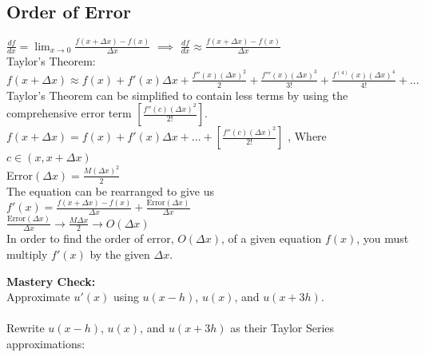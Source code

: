 \documentclass{article}
\def\ds{\displaystyle}
\def\d#1#2{\frac{d#1}{d#2}} %
\begin{document}
\subsection{Order of Error}
\begin{center}
$\ds \d{f}{x} = \lim_{x \to 0} \frac{f(x + \Delta x) - f(x)}{\Delta x}$ \hspace{1cm} $\implies$ \hspace{1cm}
$\ds \d{f}{x} \approx \frac{f(x + \Delta x) - f(x)}{\Delta x}$ \\ \vspace{5mm}
Taylor's Theorem: \phantom{aa} $ f(x + \Delta x) \approx f(x) + f'(x)\Delta x + \frac{f''(x) (\Delta x)^2}{2} + \frac{f'''(x) (\Delta x)^3}{3!} + \frac{f^{(4)}(x) (\Delta x)^4}{4!} + ...$ \\ \vspace{5mm}
Taylor's Theorem can be simplified to contain less terms by using the comprehensive error term $[\frac{f''(c) (\Delta x)^2}{2!}]$.\\ \vspace{5mm}
$ f(x + \Delta x) = f(x) + f'(x)\Delta x + ... + [\frac{f''(c) (\Delta x)^2}{2!}]$ \hspace{1cm} , \hspace{1cm} Where $c \in (x, x+ \Delta x)$\\ \vspace{5mm}
Error$(\Delta x) = \frac{M (\Delta x)^2}{2}$ \\ \vspace{5mm}
The equation can be rearranged to give us \\ \vspace{5mm}
$\boxed{f'(x) = \frac{f(x+ \Delta x) - f(x)}{\Delta x} + \frac{\textrm{Error}(\Delta x)}{\Delta x}}$ \\ \vspace{5mm}
$\frac{\textrm{Error}(\Delta x)}{\Delta x} \rightarrow \frac{M \Delta x}{2} \rightarrow O(\Delta x)$\\ \vspace{5mm}
In order to find the order of error, $O( \Delta x)$, of a given equation $f(x)$, you must multiply $f'(x)$ by the given $\Delta x$. \\
\end{center} \textbf{Mastery Check:} \\
Approximate $u'(x)$ using $u(x-h)$, $u(x)$, and $u(x+3h)$.\\ \\
 Rewrite $u(x-h)$, $u(x)$, and $u(x+3h)$ as their Taylor Series approximations:
\end{document}
